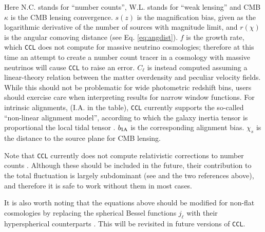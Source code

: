 \documentclass[\docopts]{\docclass}
\newcommand{\ccl}{{\tt CCL}\xspace}
\begin{document}
  Here N.C. stands for ``number counts'', W.L. stands for ``weak lensing'' and CMB $\kappa$ is the CMB lensing convergence. $s(z)$ is the magnification bias, given as the logarithmic derivative of the number of sources with magnitude limit, and $r(\chi)$ is the angular comoving distance (see Eq. \ref{eq:angdist}). $f$ is the growth rate, which \ccl does not compute for massive neutrino cosmologies; therefore at this time an attempt to create a number count tracer in a cosmology with massive neutrinos will cause \ccl to raise an error. $C_\ell$ is instead computed assuming a linear-theory relation between the matter overdensity and peculiar velocity fields. While this should not be problematic for wide photometric redshift bins, users should exercise care when interpreting results for narrow window functions. For intrinsic alignments, (I.A. in the table), \ccl currently supports the so-called ``non-linear alignment model'', according to which the galaxy inertia tensor is proportional the local tidal tensor \cite{2004PhRvD..70f3526H,2007MNRAS.381.1197H}. $b_{\rm IA}$ is the corresponding alignment bias. $\chi_s$ is the distance to the source plane for CMB lensing.

  Note that \ccl currently does not compute relativistic corrections to number counts \cite{2011PhRvD..84d3516C,2011PhRvD..84f3505B}. Although these should be included in the future, their contribution to the total fluctuation is largely subdominant (see \cite{GReffects} and the two references above), and therefore it is safe to work without them in most cases.

  It is also worth noting that the equations above should be modified for non-flat cosmologies by replacing the spherical Bessel functions $j_\ell$ with their hyperspherical counterparts \cite{1994ApJ...432....7K}. This will be revisited in future versions of \ccl.
  
\end{document}
